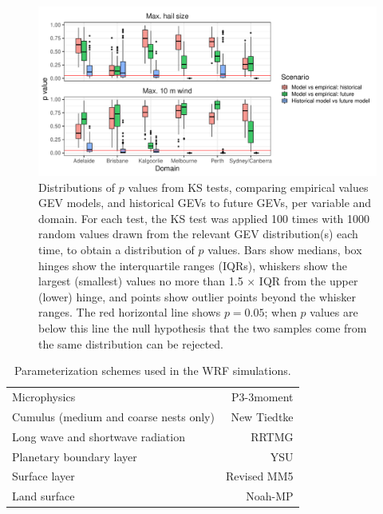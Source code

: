 \documentclass[draft,grl]{agutexSI2019}\usepackage[]{graphicx}\usepackage[]{xcolor}
\begin{document}
\begin{figure}[!ht]
    \includegraphics[width=\textwidth]{figures/fit_pvals}
    \caption{Distributions of $p$ values from KS tests, comparing empirical values GEV models, and historical GEVs to future GEVs, per variable and domain. For each test, the KS test was applied 100 times with 1000 random values drawn from the relevant GEV distribution(s) each time, to obtain a distribution of $p$ values. Bars show medians, box hinges show the interquartile ranges (IQRs), whiskers show the largest (smallest) values no more than 1.5 $\times$ IQR from the upper (lower) hinge, and points show outlier points beyond the whisker ranges. The red horizontal line shows $p = 0.05$; when $p$ values are below this line the null hypothesis that the two samples come from the same distribution can be rejected.}
    \label{fig:ks_pvals}
\end{figure}

\clearpage

\begin{table}[!ht]
    \caption{Parameterization schemes used in the WRF simulations.}
    \label{tab:schemes}
    \centering
    \begin{tabular}{lr}
          \hline
          Microphysics & P3-3moment \cite{Milbrandt_JAS_2021} \\
          Cumulus (medium and coarse nests only) & New Tiedtke \cite{Zhang_JC_2017} \\
          Long wave and shortwave radiation & RRTMG \cite{Iacono_JGRA_2008} \\
          Planetary boundary layer & YSU \cite{Hong_MWR_2006} \\
          Surface layer & Revised MM5 \cite{Jimenez_MWR_2012} \\
          Land surface & Noah-MP \cite{Niu_JGRA_2011} \\
          \hline
    \end{tabular}
\end{table}
\end{document}

